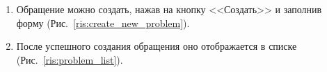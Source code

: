 \documentclass{../includes/TechDoc}
\begin{document}
\begin{enumerate}
        \item Обращение можно создать, нажав на кнопку <<Создать>> и заполнив форму (Рис.~\ref{ris:create_new_problem}).
        \item После успешного создания обращения оно отображается в списке (Рис.~\ref{ris:problem_list}).
        \begin{figure}[h]
            \begin{center}
                \begin{minipage}[h]{0.35\linewidth}

\end{minipage}
\end{center}
\end{figure}
\end{enumerate}
\end{document}
